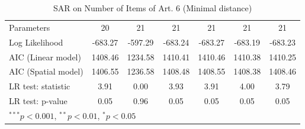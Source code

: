 \begin{table}[!h]
\begin{center}
\begin{tabular}{l c c c c c c }
Parameters              & 20           & 21            & 21           & 21           & 21           & 21           \\
Log Likelihood          & -683.27      & -597.29       & -683.24      & -683.27      & -683.19      & -683.23      \\
AIC (Linear model)      & 1408.46      & 1234.58       & 1410.41      & 1410.46      & 1410.38      & 1410.25      \\
AIC (Spatial model)     & 1406.55      & 1236.58       & 1408.48      & 1408.55      & 1408.38      & 1408.46      \\
LR test: statistic      & 3.91         & 0.00          & 3.93         & 3.91         & 4.00         & 3.79         \\
LR test: p-value        & 0.05         & 0.96          & 0.05         & 0.05         & 0.05         & 0.05         \\
\bottomrule
\multicolumn{7}{l}{\scriptsize{$^{***}p<0.001$, $^{**}p<0.01$, $^*p<0.05$}}
\end{tabular}
\caption{SAR on Number of Items of Art. 6 (Minimal distance)}
\label{table:coefficients}
\end{center}
\end{table}
